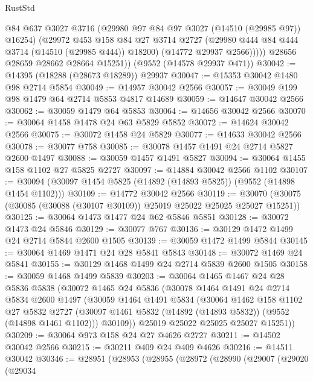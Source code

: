 \begin{lexlean}{RustStd}
\begin{coremodule}
              @84
              @637
              @3027
              @3716
              (@29980 @97 @84 @97 @3027 (@14510 (@29985 @97)) @16254)
              (@29972
                @453
                @158
                @84
                @27
                @3714
                @2727
                (@29980 @444 @84 @444 @3714 (@14510 (@29985 @444)) @18200)
                (@14772 @29937 @2566)))))
        @28656
        @28659
        @28662
        @28664
        @15251))
    (@9552 (@14578 @29937 @471))
@30042 := @14395 (@18288 (@28673 @18289)) @29937
@30047 := @15353 @30042 @1480 @98 @2714 @5854
@30049 := @14957 @30042 @2566
@30057 := @30049 @199 @98 @1479 @64 @2714 @5853 @4817 @14689
@30059 := @14647 @30042 @2566
@30062 := @30059 @1479 @64 @5853
@30064 := @14656 @30042 @2566
@30070 := @30064 @1458 @1478 @24 @63 @5829 @5852
@30072 := @14624 @30042 @2566
@30075 := @30072 @1458 @24 @5829
@30077 := @14633 @30042 @2566
@30078 := @30077 @758
@30085 := @30078 @1457 @1491 @24 @2714 @5827 @2600 @1497
@30088 := @30059 @1457 @1491 @5827
@30094 := @30064 @1455 @158 @1102 @27 @5825 @2727
@30097 := @14884 @30042 @2566 @1102
@30107 := @30094 (@30097 @1454 @5825 (@14892 (@14893 @5825)) (@9552 (@14898 @1454 @1102)))
@30109 := @14772 @30042 @2566
@30119 := @30070 (@30075 (@30085 (@30088 (@30107 @30109)) @25019 @25022 @25025 @25027 @15251))
@30125 := @30064 @1473 @1477 @24 @62 @5846 @5851
@30128 := @30072 @1473 @24 @5846
@30129 := @30077 @767
@30136 := @30129 @1472 @1499 @24 @2714 @5844 @2600 @1505
@30139 := @30059 @1472 @1499 @5844
@30145 := @30064 @1469 @1471 @24 @28 @5841 @5843
@30148 := @30072 @1469 @24 @5841
@30155 := @30129 @1468 @1499 @24 @2714 @5839 @2600 @1505
@30158 := @30059 @1468 @1499 @5839
@30203 := @30064
    @1465
    @1467
    @24
    @28
    @5836
    @5838
    (@30072
      @1465
      @24
      @5836
      (@30078
        @1464
        @1491
        @24
        @2714
        @5834
        @2600
        @1497
        (@30059
          @1464
          @1491
          @5834
          (@30064
            @1462
            @158
            @1102
            @27
            @5832
            @2727
            (@30097 @1461 @5832 (@14892 (@14893 @5832)) (@9552 (@14898 @1461 @1102)))
            @30109))
        @25019
        @25022
        @25025
        @25027
        @15251))
@30209 := @30064 @973 @158 @24 @27 @4626 @2727
@30211 := @14502 @30042 @2566
@30215 := @30211 @409 @24 @409 @4626
@30216 := @14511 @30042
@30346 := @28951
    (@28953
      (@28955
        (@28972
          (@28990
            (@29007
              (@29020
                (@29034

\end{coremodule}
\end{lexlean}
